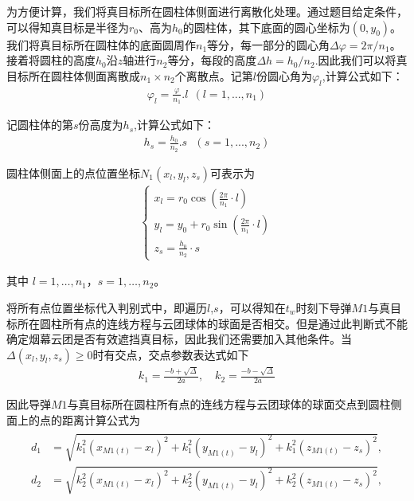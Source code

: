 \documentclass[../main.tex]{subfiles}
\begin{document}
\par 为方便计算，我们将真目标所在圆柱体侧面进行离散化处理。通过题目给定条件，可以得知真目标是半径为$r_0$、高为$h_0$的圆柱体，其下底面的圆心坐标为$\left( 0,y_0 \right)$。我们将真目标所在圆柱体的底面圆周作$n_1$等分，每一部分的圆心角$\varDelta \varphi =2\pi /n_1$。接着将圆柱的高度$h_0$沿$z$轴进行$n_2$等分，每段的高度$\varDelta h=h_0/n_2$.因此我们可以将真目标所在圆柱体侧面离散成$n_1\times n_2$个离散点。记第$l$份圆心角为$\varphi _l$,计算公式如下：
\begin{align}\label{1.13}
	\varphi _l=\frac{\varphi}{n_1}.l\ \ \left( l=1,...,n_1 \right) 
\end{align}
\par 记圆柱体的第$s$份高度为$h_s$,计算公式如下：
\begin{align}\label{1.14}
	h_s=\frac{h_0}{n_2}.s\,\,\,\,\left( s=1,...,n_2 \right) 
\end{align}
\par 圆柱体侧面上的点位置坐标$N_1\left( x_l,y_l,z_s \right) $可表示为
\begin{align}
	\begin{cases}\label{1.15}
x_l = r_0 \cos\left( \frac{2\pi}{n_1} \cdot l \right) \\
y_l = y_0 + r_0 \sin\left( \frac{2\pi}{n_1} \cdot l \right) \\
z_s = \frac{h_0}{n_2} \cdot s
\end{cases}
\end{align}	
\par 其中 \( l = 1, \dots, n_1 \)，\( s = 1, \dots, n_2 \)。
\par 将所有点位置坐标代入判别式中，即遍历$l$,$s$，可以得知在$t_w$时刻下导弹$M1$与真目标所在圆柱所有点的连线方程与云团球体的球面是否相交。但是通过此判断式不能确定烟幕云团是否有效遮挡真目标，因此我们还需要加入其他条件。当$\Delta \left( x_l,y_l,z_s \right) \ge 0$时有交点，交点参数表达式如下
\begin{align}\label{1.16}
k_1 = \frac{-b + \sqrt{\Delta}}{2a}, \quad k_2 = \frac{-b - \sqrt{\Delta}}{2a}
\end{align}
\par 因此导弹$M1$与真目标所在圆柱所有点的连线方程与云团球体的球面交点到圆柱侧面上的点的距离计算公式为
\begin{align}\label{1.17}
	\begin{aligned}
d_1 &= \sqrt{k_1^2(x_{M1(t)} - x_l)^2 + k_1^2(y_{M1(t)} - y_l)^2 + k_1^2(z_{M1(t)} - z_s)^2}, \\
d_2 &= \sqrt{k_2^2(x_{M1(t)} - x_l)^2 + k_2^2(y_{M1(t)} - y_l)^2 + k_2^2(z_{M1(t)} - z_s)^2},
\end{aligned}
\end{align}
\end{document}
